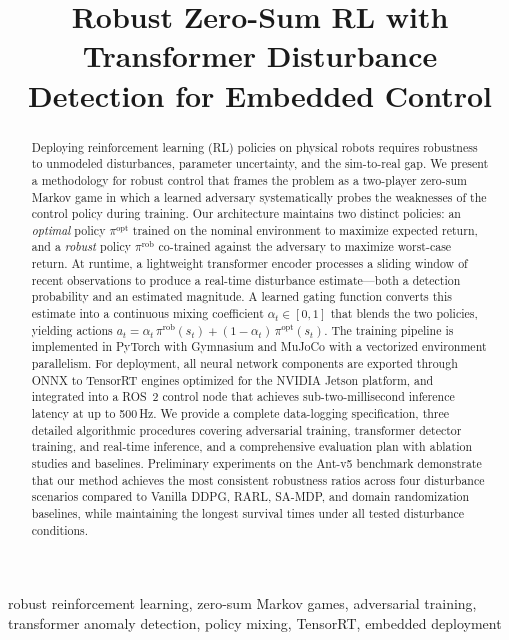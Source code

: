 \documentclass[conference]{IEEEtran}
\title{Robust Zero-Sum RL with Transformer Disturbance\\
Detection for Embedded Control}
\author{
\IEEEauthorblockN{Hadi Nobahari,
Ali Baniasad}
\IEEEauthorblockA{Department of Aerospace Engineering,
Sharif University of Technology, Tehran, Iran\\
Email: nobahari@sharif.ir, ali\_baniasad@ae.sharif.edu}
}
\newcommand{\piopt}{\pi^{\text{opt}}}
\newcommand{\pirob}{\pi^{\text{rob}}}
\begin{document}
\maketitle

\begin{IEEEkeywords}
robust reinforcement learning, zero-sum Markov games, adversarial training,
transformer anomaly detection, policy mixing, TensorRT, embedded deployment
\end{IEEEkeywords}

\begin{abstract}
Deploying reinforcement learning (RL) policies on physical robots requires
robustness to unmodeled disturbances, parameter uncertainty, and the
sim-to-real gap.  We present a methodology for robust control that frames
the problem as a two-player zero-sum Markov game in which a learned
adversary systematically probes the weaknesses of the control policy during
training.  Our architecture maintains two distinct policies: an
\emph{optimal} policy $\piopt$ trained on the nominal environment to
maximize expected return, and a \emph{robust} policy $\pirob$ co-trained
against the adversary to maximize worst-case return.  At runtime, a
lightweight transformer encoder processes a sliding window of recent
observations to produce a real-time disturbance estimate---both a detection
probability and an estimated magnitude.  A learned gating function converts
this estimate into a continuous mixing coefficient $\alpha_t \in [0,1]$
that blends the two policies, yielding actions
$a_t = \alpha_t\,\pirob(s_t) + (1-\alpha_t)\,\piopt(s_t)$.  The training
pipeline is implemented in PyTorch with Gymnasium and MuJoCo with a vectorized environment
parallelism.  For deployment, all neural network components are exported
through ONNX to TensorRT engines optimized for the NVIDIA Jetson platform,
and integrated into a ROS~2 control node that achieves sub-two-millisecond
inference latency at up to 500\,Hz.  We provide a complete data-logging
specification, three detailed algorithmic procedures covering adversarial
training, transformer detector training, and real-time inference, and a
comprehensive evaluation plan with ablation studies and baselines.
Preliminary experiments on the Ant-v5 %
benchmark demonstrate that our
method achieves the most consistent robustness ratios across four
disturbance scenarios compared to Vanilla DDPG, RARL, SA-MDP, and domain
randomization baselines, while maintaining the longest survival times
under all tested disturbance conditions.
\end{abstract}
\end{document}
